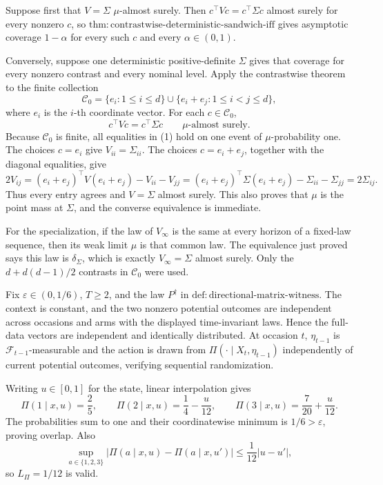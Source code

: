 Suppose first that \(V=\Sigma\) \(\mu\)-almost surely. Then \(c^\top Vc=c^\top\Sigma c\) almost surely for every nonzero \(c\), so \(\mathrm{thm:contrastwise\text{-}deterministic\text{-}sandwich\text{-}iff}\) gives asymptotic coverage \(1-\alpha\) for every such \(c\) and every \(\alpha\in(0,1)\).

Conversely, suppose one deterministic positive-definite \(\Sigma\) gives that coverage for every nonzero contrast and every nominal level. Apply the contrastwise theorem to the finite collection
\[
 \mathcal C_0=\{e_i:1\le i\le d\}\cup
 \{e_i+e_j:1\le i<j\le d\},
\]
where \(e_i\) is the \(i\)-th coordinate vector. For each \(c\in\mathcal C_0\),
\[
 c^\top Vc=c^\top\Sigma c
 \qquad\mu\text{-almost surely}.
\tag{1}
\]
Because \(\mathcal C_0\) is finite, all equalities in (1) hold on one event of \(\mu\)-probability one. The choices \(c=e_i\) give \(V_{ii}=\Sigma_{ii}\). The choices \(c=e_i+e_j\), together with the diagonal equalities, give
\[
 2V_{ij}=(e_i+e_j)^\top V(e_i+e_j)-V_{ii}-V_{jj}
 =(e_i+e_j)^\top\Sigma(e_i+e_j)-\Sigma_{ii}-\Sigma_{jj}
 =2\Sigma_{ij}.
\tag{2}
\]
Thus every entry agrees and \(V=\Sigma\) almost surely. This also proves that \(\mu\) is the point mass at \(\Sigma\), and the converse equivalence is immediate.

For the specialization, if the law of \(V_\infty\) is the same at every horizon of a fixed-law sequence, then its weak limit \(\mu\) is that common law. The equivalence just proved says this law is \(\delta_\Sigma\), which is exactly \(V_\infty=\Sigma\) almost surely. Only the \(d+d(d-1)/2\) contrasts in \(\mathcal C_0\) were used.

Fix \(\varepsilon\in(0,1/6)\), \(T\ge2\), and the law \(P^{\dagger}\) in \(\mathrm{def:directional\text{-}matrix\text{-}witness}\). The context is constant, and the two nonzero potential outcomes are independent across occasions and arms with the displayed time-invariant laws. Hence the full-data vectors are independent and identically distributed. At occasion \(t\), \(\eta_{t-1}\) is \(\mathcal F_{t-1}\)-measurable and the action is drawn from \(\Pi(\cdot\mid X_t,\eta_{t-1})\) independently of current potential outcomes, verifying sequential randomization.

Writing \(u\in[0,1]\) for the state, linear interpolation gives
\[
 \Pi(1\mid x,u)=\frac25,\qquad
 \Pi(2\mid x,u)=\frac14-\frac{u}{12},\qquad
 \Pi(3\mid x,u)=\frac7{20}+\frac{u}{12}.
\tag{1}
\]
The probabilities sum to one and their coordinatewise minimum is \(1/6>\varepsilon\), proving overlap. Also
\[
 \sup_{a\in\{1,2,3\}}|\Pi(a\mid x,u)-\Pi(a\mid x,u')|
 \le\frac1{12}|u-u'|,
\tag{2}
\]
so \(L_\Pi=1/12\) is valid.

